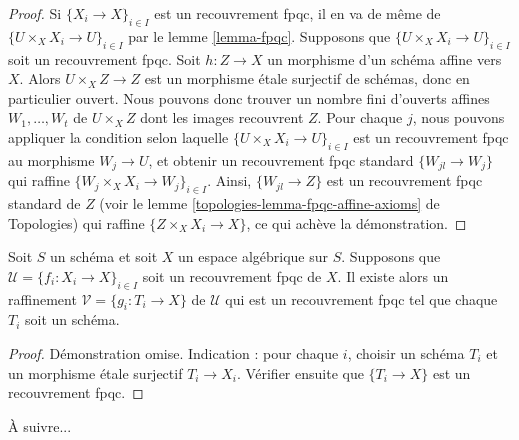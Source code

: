 \begin{proof}
Si $\{X_i \to X\}_{i \in I}$ est un recouvrement fpqc, il en va de même de
$\{U \times_X X_i \to U\}_{i \in I}$ par le lemme \ref{lemma-fpqc}.
Supposons que $\{U \times_X X_i \to U\}_{i \in I}$ soit un recouvrement fpqc.
Soit $h : Z \to X$ un morphisme d'un schéma affine vers $X$.
Alors $U \times_X Z \to Z$ est un morphisme \'etale surjectif
de schémas, donc en particulier ouvert. Nous pouvons donc trouver un nombre fini d'ouverts affines
$W_1, \ldots, W_t$ de $U \times_X Z$ dont les images recouvrent $Z$.
Pour chaque $j$, nous pouvons appliquer la condition selon laquelle
$\{U \times_X X_i \to U\}_{i \in I}$ est un recouvrement fpqc
au morphisme $W_j \to U$, et obtenir un recouvrement fpqc standard
$\{W_{jl} \to W_j\}$ qui raffine $\{W_j \times_X X_i \to W_j\}_{i \in I}$.
Ainsi, $\{W_{jl} \to Z\}$ est un recouvrement fpqc standard de $Z$
(voir le
lemme \ref{topologies-lemma-fpqc-affine-axioms} de Topologies)
qui raffine $\{Z \times_X X_i \to X\}$, ce qui achève la démonstration.
\end{proof}

\begin{lemma}
\label{lemma-refine-fpqc-schemes}
Soit $S$ un schéma et soit $X$ un espace algébrique sur $S$.
Supposons que $\mathcal{U} = \{f_i : X_i \to X\}_{i \in I}$ soit un
recouvrement fpqc de $X$. Il existe alors un raffinement
$\mathcal{V} = \{g_i : T_i \to X\}$ de $\mathcal{U}$ qui est un
recouvrement fpqc tel que chaque $T_i$ soit un schéma.
\end{lemma}

\begin{proof}
Démonstration omise. Indication : pour chaque $i$, choisir un schéma $T_i$ et un morphisme \'etale
surjectif $T_i \to X_i$. Vérifier ensuite que $\{T_i \to X\}$ est un recouvrement fpqc.
\end{proof}

\noindent
À suivre...












